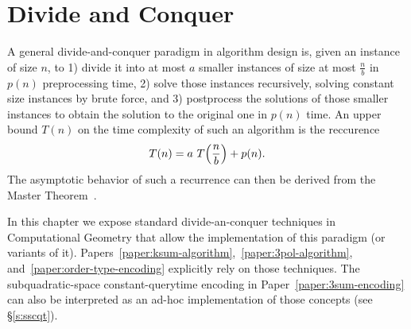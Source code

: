 \chapter{Divide and Conquer}%
\label{chapter:divide-and-conquer}

A general divide-and-conquer paradigm in algorithm design is,
given an instance of size \(n\), to 1) divide it into at most
\(a\) smaller instances of size at most \(\frac{n}{b}\) in \(p(n)\)
preprocessing time, 2) solve those instances recursively,
solving constant size instances by brute force, and 3) postprocess the
solutions of those smaller instances to obtain the solution to the original
one in \(p(n)\) time.
%
An upper bound \(T(n)\) on the time complexity of such an algorithm is the
reccurence
\begin{displaymath}
	T(n) = a \,\, T\mleft(\frac nb\mright) + p(n).
\end{displaymath}
%
The asymptotic behavior of such a recurrence can then be derived from the
Master Theorem~\cite{BHS80,CLRS09}.

In this chapter we expose standard divide-an-conquer techniques in
Computational Geometry that allow the implementation of this paradigm (or
variants of it).
%
Papers~\ref{paper:ksum-algorithm},~\ref{paper:3pol-algorithm},
and~\ref{paper:order-type-encoding} explicitly rely on those techniques.
%
The subquadratic-space constant-querytime encoding in
Paper~\ref{paper:3sum-encoding} can also be interpreted as an ad-hoc
implementation of those concepts (see \S\ref{s:sscqt}).




